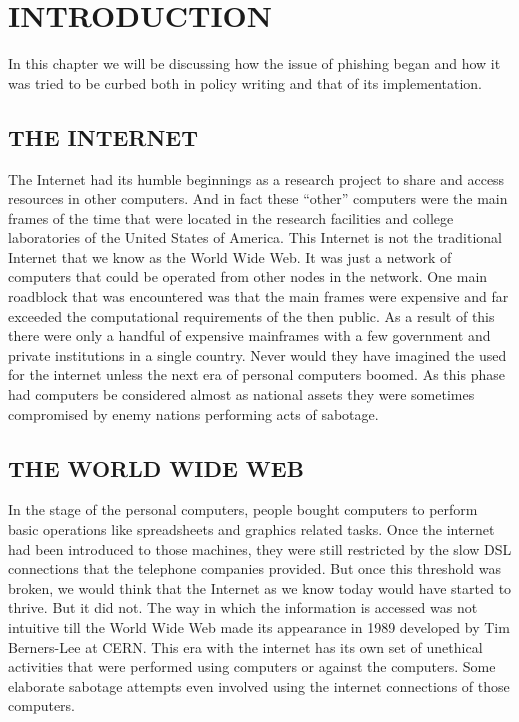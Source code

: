 
\chapter{INTRODUCTION} %
In this chapter we will be discussing how the issue of phishing began and how it was tried to be curbed both in policy writing and that of its implementation.

\section{THE INTERNET} %
The Internet had its humble beginnings as a research project to share and access resources in other computers. And in fact these “other” computers were the main frames of the time that were located in the research facilities and college laboratories of the United States of America. This Internet is not the traditional Internet that we know as the World Wide Web. It was just a network of computers that could be operated from other nodes in the network. One main roadblock that was encountered was that the main frames were expensive and far exceeded the computational requirements of the then public. As a result of this there were only a handful of expensive mainframes with a few government and private institutions in a single country. Never would they have imagined the used for the internet unless the next era of personal computers boomed. As this phase had computers be considered almost as national assets they were sometimes compromised by enemy nations performing acts of sabotage. 

\section{THE WORLD WIDE WEB}
In the stage of the personal computers, people bought computers  to perform basic operations like spreadsheets and graphics related tasks. Once the internet had been introduced to those machines, they were still restricted by the slow DSL connections that the telephone companies provided. But once this threshold was broken, we would think that the Internet as we know today would have started to thrive. But it did not. The way in which the information is accessed was not intuitive till the World Wide Web made its appearance  in 1989 developed by Tim Berners-Lee at CERN. This era with the internet has its own set of unethical activities that were performed using computers or against the computers. Some elaborate sabotage attempts even involved using the internet connections of those computers.

